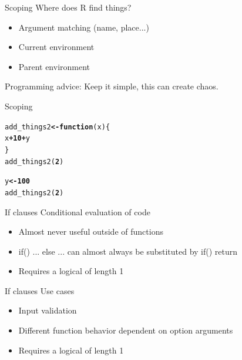 \documentclass{beamer}\usepackage[]{graphicx}\usepackage[]{color}
\makeatletter
\newcommand{\hlnum}[1]{\textcolor[rgb]{0.502,0,0.502}{\textbf{#1}}}%
\newcommand{\hlopt}[1]{\textcolor[rgb]{1,0,0.502}{\textbf{#1}}}%
\newcommand{\hlstd}[1]{\textcolor[rgb]{0,0,0}{#1}}%
\newcommand{\hlkwa}[1]{\textcolor[rgb]{0.733,0.475,0.467}{\textbf{#1}}}%
\newcommand{\hlkwb}[1]{\textcolor[rgb]{0.502,0.502,0.753}{\textbf{#1}}}%
\newcommand{\hlkwc}[1]{\textcolor[rgb]{0,0.502,0.753}{#1}}%
\newcommand{\hlkwd}[1]{\textcolor[rgb]{0,0.267,0.4}{#1}}%
\newenvironment{kframe}{%
 \def\at@end@of@kframe{}%
 \ifinner\ifhmode%
  \def\at@end@of@kframe{\end{minipage}}%
  \begin{minipage}{\columnwidth}%
 \fi\fi%
 \def\FrameCommand##1{\hskip\@totalleftmargin \hskip-\fboxsep
 \colorbox{shadecolor}{##1}\hskip-\fboxsep
     \hskip-\linewidth \hskip-\@totalleftmargin \hskip\columnwidth}%
 \MakeFramed {\advance\hsize-\width
   \@totalleftmargin\z@ \linewidth\hsize
   \@setminipage}}%
 {\par\unskip\endMakeFramed%
 \at@end@of@kframe}
\makeatother
\begin{document}
\begin{frame}{Scoping}
Where does R find things?
\begin{itemize}
  \item Argument matching (name, place...)
  \item Current environment
  \item Parent environment
\end{itemize}
Programming advice:
Keep it simple, this can create chaos.
\end{frame}

\begin{frame}[fragile]{Scoping}
\begin{kframe}
\begin{alltt}
\hlstd{add_things2} \hlkwb{<-} \hlkwa{function}\hlstd{(}\hlkwc{x}\hlstd{) \{}
  \hlstd{x} \hlopt{+} \hlnum{10} \hlopt{+} \hlstd{y}
\hlstd{\}}
\hlkwd{add_things2}\hlstd{(}\hlnum{2}\hlstd{)}
\end{alltt}


{\ttfamily\noindent\bfseries\color{errorcolor}{\#\# Error in add\_things2(2): object 'y' not found}}\begin{alltt}
\hlstd{y} \hlkwb{<-} \hlnum{100}
\hlkwd{add_things2}\hlstd{(}\hlnum{2}\hlstd{)}
\end{alltt}
\end{kframe}[1] 112

\end{frame}

\begin{frame}{If clauses}
Conditional evaluation of code
\begin{itemize}
  \item Almost never useful outside of functions
  \item if() ... else ... can almost always be substituted by if() return
  \item Requires a logical of length 1
\end{itemize}
\end{frame}

\begin{frame}{If clauses}
Use cases
\begin{itemize}
  \item Input validation
  \item Different function behavior dependent on option arguments
  \item Requires a logical of length 1
\end{itemize}
\end{frame}
\end{document}

